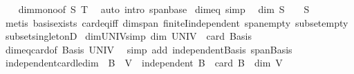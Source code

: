 \begin{isabellebody}
%
\isadelimproof
\ \ %
\endisadelimproof
%
\isatagproof
{}\isamarkupfalse%
\ dim{\isacharunderscore}{\kern0pt}mono{\isacharbrackleft}{\kern0pt}of\ S\ T{\isacharbrackright}{\kern0pt}\ \isamarkupfalse%
\ {\isacharparenleft}{\kern0pt}auto\ intro{\isacharcolon}{\kern0pt}\ span{\isacharunderscore}{\kern0pt}base{\isacharparenright}{\kern0pt}%
\endisatagproof
{\isafoldproof}%
%
\isadelimproof
\isanewline
%
\endisadelimproof
\isanewline
{}\isamarkupfalse%
\ dim{\isacharunderscore}{\kern0pt}eq{\isacharunderscore}{\kern0pt}{}\ {\isacharbrackleft}{\kern0pt}simp{\isacharbrackright}{\kern0pt}{\isacharcolon}{\kern0pt}\isanewline
\ \ {\isachardoublequoteopen}dim\ S\ {\isacharequal}{\kern0pt}\ {}\ {\isasymlongleftrightarrow}\ S\ {\isasymsubseteq}\ {\isacharbraceleft}{\kern0pt}{}{\isacharbraceright}{\kern0pt}{\isachardoublequoteclose}\isanewline
%
\isadelimproof
\ \ %
\endisadelimproof
%
\isatagproof
{}\isamarkupfalse%
\ {\isacharparenleft}{\kern0pt}metis\ basis{\isacharunderscore}{\kern0pt}exists\ card{\isacharunderscore}{\kern0pt}eq{\isacharunderscore}{\kern0pt}{}{\isacharunderscore}{\kern0pt}iff\ dim{\isacharunderscore}{\kern0pt}span\ finiteI{\isacharunderscore}{\kern0pt}independent\ span{\isacharunderscore}{\kern0pt}empty\ subset{\isacharunderscore}{\kern0pt}empty\ subset{\isacharunderscore}{\kern0pt}singletonD{\isacharparenright}{\kern0pt}%
\endisatagproof
{\isafoldproof}%
%
\isadelimproof
\isanewline
%
\endisadelimproof
\isanewline
{}\isamarkupfalse%
\ dim{\isacharunderscore}{\kern0pt}UNIV{\isacharbrackleft}{\kern0pt}simp{\isacharbrackright}{\kern0pt}{\isacharcolon}{\kern0pt}\ {\isachardoublequoteopen}dim\ UNIV\ {\isacharequal}{\kern0pt}\ card\ Basis{\isachardoublequoteclose}\isanewline
%
\isadelimproof
\ \ %
\endisadelimproof
%
\isatagproof
{}\isamarkupfalse%
\ dim{\isacharunderscore}{\kern0pt}eq{\isacharunderscore}{\kern0pt}card{\isacharbrackleft}{\kern0pt}of\ Basis\ UNIV{\isacharbrackright}{\kern0pt}\ \isamarkupfalse%
\ {\isacharparenleft}{\kern0pt}simp\ add{\isacharcolon}{\kern0pt}\ independent{\isacharunderscore}{\kern0pt}Basis\ span{\isacharunderscore}{\kern0pt}Basis{\isacharparenright}{\kern0pt}%
\endisatagproof
{\isafoldproof}%
%
\isadelimproof
\isanewline
%
\endisadelimproof
\isanewline
{}\isamarkupfalse%
\ independent{\isacharunderscore}{\kern0pt}card{\isacharunderscore}{\kern0pt}le{\isacharunderscore}{\kern0pt}dim{\isacharcolon}{\kern0pt}\ \ {\isachardoublequoteopen}B\ {\isasymsubseteq}\ V{\isachardoublequoteclose}\ \ {\isachardoublequoteopen}independent\ B{\isachardoublequoteclose}\ \ {\isachardoublequoteopen}card\ B\ {\isasymle}\ dim\ V{\isachardoublequoteclose}\isanewline

\end{isabellebody}
